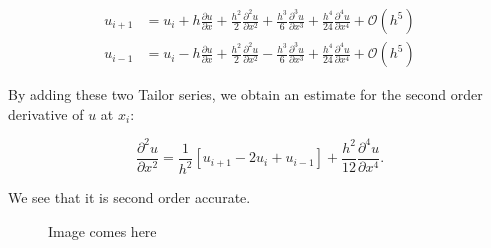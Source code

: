 \documentclass[a4paper]{article}
\newcommand{\dux}{\frac{\partial u}{\partial x}}
\newcommand{\duxx}{\frac{\partial^2 u}{\partial x^2}}
\newcommand{\duxxx}{\frac{\partial^3 u}{\partial x^3}}
\begin{document}
\begin{align}
  u_{i + 1} & = u_i + h \dux + \frac{h^2}{2} \duxx + \frac{h^3}{6} \duxxx
                + \frac{h^4}{24} \frac{\partial^4 u}{\partial x^4} + \mathcal{O}(h^5) \\
%
  u_{i - 1} & = u_i - h \dux + \frac{h^2}{2} \duxx - \frac{h^3}{6} \duxxx
                + \frac{h^4}{24} \frac{\partial^4 u}{\partial x^4} + \mathcal{O}(h^5)
\end{align}

By adding these two Tailor series, we obtain an estimate for the second order derivative of
$u$ at $x_i$:

\begin{equation}
  \duxx = \frac{1}{h^2}[ u_{i + 1} - 2 u_i + u_{i - 1} ]
          + \frac{h^2}{12} \frac{\partial^4 u}{\partial x^4}.
\end{equation}

We see that it is second order accurate.

\begin{figure}
  \label{fig:1dcase}
  \begin{center}
  \end{center}
  \caption{Image comes here}
\end{figure}
\end{document}
